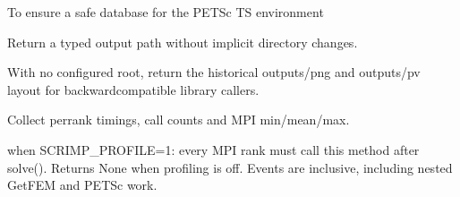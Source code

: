 \documentclass[letterpaper,10pt,english]{sphinxmanual}
\begin{document}
\begin{fulllineitems}
\begin{fulllineitems}
\begin{description}
\end{description}

\end{fulllineitems}


\begin{fulllineitems}
\label{\detokenize{scrimp:scrimp.dphs.DPHS.get_cleared_TS_options}}
\pysigstartsignatures
\pysiglinewithargsret
{}
{}
{}
\pysigstopsignatures
\sphinxAtStartPar
To ensure a safe database for the PETSc TS environment

\end{fulllineitems}


\begin{fulllineitems}
\label{\detokenize{scrimp:scrimp.dphs.DPHS.get_output_path}}
\pysigstartsignatures
\pysiglinewithargsret
{}
{\sphinxparamcomma {}\sphinxparamcomma {}\sphinxparamcomma {}}
{}
\pysigstopsignatures
\sphinxAtStartPar
Return a typed output path without implicit directory changes.

\sphinxAtStartPar
With no configured root, return the historical outputs/png and
outputs/pv layout for backward\sphinxhyphen{}compatible library callers.

\end{fulllineitems}


\begin{fulllineitems}
\label{\detokenize{scrimp:scrimp.dphs.DPHS.get_profile}}
\pysigstartsignatures
\pysiglinewithargsret
{}
{}
{}
\pysigstopsignatures
\sphinxAtStartPar
Collect per\sphinxhyphen{}rank timings, call counts and MPI min/mean/max.

\sphinxAtStartPar
{} when SCRIMP\_PROFILE=1: every MPI rank must call
this method after solve(). Returns None when profiling is off.
Events are inclusive, including nested GetFEM and PETSc work.


\end{fulllineitems}
\end{fulllineitems}
\end{document}
